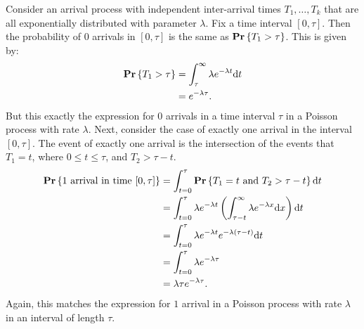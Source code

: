 Consider an arrival process with independent inter-arrival times $T_1, \ldots, T_k$ that are all exponentially distributed with
parameter $\lambda$. Fix a time interval $[0, \tau]$. Then the probability of $0$ arrivals in $[0, \tau]$ is the same as
$\mathbf{Pr} \left \{ T_1 > \tau \right \}$. This is given by:
\begin{align*}
\mathbf{Pr} \left \{ T_1 > \tau \right \} & = \int_{\tau}^{\infty} \lambda e^{- \lambda t} \text{d} t \\
        & = e^{- \lambda \tau}.
\end{align*}
But this exactly the expression for $0$ arrivals in a time interval $\tau$ in a Poisson process with rate $\lambda$. Next, consider
the case of exactly one arrival in the interval $[0, \tau]$. The event of exactly one arrival is the intersection
of the events that $T_1 = t$, where $0 \leq t \leq \tau$, and $T_2 > \tau - t$.
\begin{align*}
    \mathbf{Pr} \left \{ 1 \text{ arrival in time } [0, \tau] \right \} & = \int_{t = 0}^{\tau} \mathbf{Pr} \left \{ T_1 = t \text{ and } T_2 > \tau - t \right \} \text{d} t \\
        & = \int_{t = 0}^{\tau} \lambda e^{- \lambda t} \left ( \int_{\tau - t}^{\infty} \lambda e^{-\lambda x } \text{d} x \right ) \text{d} t \\
        & = \int_{t = 0}^{\tau} \lambda e^{- \lambda t} e^{- \lambda (\tau - t)} \text{d} t \\
        & = \int_{t = 0}^{\tau} \lambda e^{- \lambda \tau} \\
        & = \lambda \tau e^{- \lambda \tau}.
\end{align*}
Again, this matches the expression for $1$ arrival in a Poisson process with rate $\lambda$ in an interval of length $\tau$.
